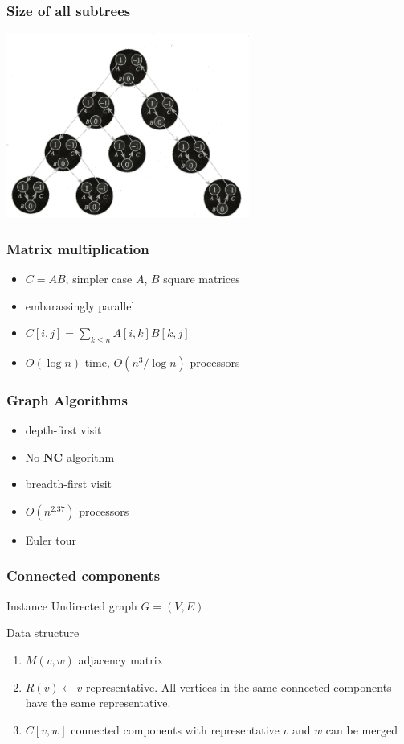 \documentclass[12pt,aspectratio=169]{beamer}
\begin{document}
\begin{frame}\frametitle{Size of all subtrees}
  \begin{center}
    \includegraphics[width=8cm]{img/euler1}
  \end{center}

\end{frame}


\begin{frame}\frametitle{Matrix multiplication}
\begin{itemize}
\item
    $C = AB$, simpler case $A$, $B$ square matrices
  \item
    embarassingly parallel
  \item
    $C[i,j] = \sum_{k\le n}A[i,k]B[k,j]$
  \item
    $O(\log n)$ time, $O(n^{3}/\log n)$ processors
  \end{itemize}
\end{frame}



\begin{frame}\frametitle{Graph Algorithms}
  \begin{itemize}
  \item
    depth-first visit
  \item
    No $\mathbf{NC}$ algorithm
  \item
    breadth-first visit
  \item
    $O(n^{2.37})$ processors
  \item
    \alert{Euler tour}
  \end{itemize}
\end{frame}


\begin{frame}\frametitle{Connected components}
\begin{block}{Instance}
Undirected graph $G=(V,E)$
\end{block}
\begin{block}{Data structure}
\begin{enumerate} 
\item
$M(v,w)$ adjacency matrix
\item
$R(v) \gets v$ representative.    
All vertices in the same connected components have the same representative.    
\item
$C[v,w]$ connected components with representative $v$ and $w$ can be merged
\end{enumerate}
\end{block}
\end{frame}
\end{document}
